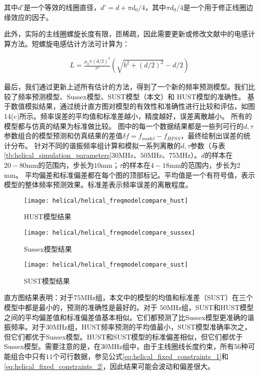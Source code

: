 其中$d'$是一个等效的线圈直径，$d'=d+\pi d_0/4$，其中$\pi d_0/4$是一个用于修正线圈边缘效应的因子。

此外，实际的主线圈螺旋长度有限，匝稀疏，因此需要更新或修改文献\cite[]{Siverns_Simkins_Weidt_Hensinger_2012}中的电感计算方法。短螺旋电感估计方法可计算为：

\begin{align}
    L=\frac{\mu_0 \pi (d/2)^2 }{\tau^2} (\sqrt{b^2+(d/2)^2}-d/2) \label{eq:helical_L_new}
\end{align}

最后，我们通过更新上述所有估计的方法，得到了一个新的频率预测模型。我们比较了频率预测模型、Sussex模型\cite[]{Siverns_Simkins_Weidt_Hensinger_2012}、SUST模型（本文）和 HUST模型\cite[]{Deng_Sun_Yuan_Xu_Zhang_Lu_Luo_2014}的准确性。
基于数值模拟结果，通过统计直方图对模型的有效性和准确性进行比较和评估，如图14(c)所示。频率误差的平均值和标准差越小，精度越好，误差离散越小。
所有的模型都与仿真的结果为标准做比较。
图中的每一个数据结果都是一些列可行的$d,\tau$参数组合的模型预测和仿真结果的差值$\delta f=f_{model}-f_{HFSS}$，最终绘制出误差的统计分布。
针对不同的谐振频率组计算和模拟一系列离散的$d,\tau$参数（与表\ref{tb:helical_simulation_parameters}$30$MHz、$50$MHz、$75$MHz）。$d$的样本在$20-80$mm的范围内，步长为$10$mm；$\tau$的样本在$4-18$mm的范围内，步长为$2$mm。
平均偏差和标准偏差都在每个图的顶部标记。平均值是一个有符号值，表示模型的整体频率预测效果。标准差表示频率误差的离散程度。
\begin{figure}
    \centering
    \caption[HUST模型结果]{HUST模型结果\label{helical_freqmodelcompare_hust}}
    \texttt{[image: helical/helical\_freqmodelcompare\_hust]}
\end{figure}

\begin{figure}
    \centering
    \caption[Sussex模型结果]{Sussex模型结果\label{helical_freqmodelcompare_sussex}}
    \texttt{[image: helical/helical\_freqmodelcompare\_sussex]}
\end{figure}

\begin{figure}
    \centering
    \caption[SUST模型结果]{SUST模型结果\label{helical_freqmodelcompare_sust}}
    \texttt{[image: helical/helical\_freqmodelcompare\_sust]}
\end{figure}

直方图结果表明：对于$75$MHz组，本文中的模型的均值和标准差（SUST）在三个模型中都是最小的，预测的准确性是最好的。对于 $50$MHz组，SUST和HUST模型之间的平均偏差值和标准偏差值基本相似。它们都预测了比Sussex模型更准确的谐振频率。对于$30$MHz组，HUST频率预测的平均值最小，SUST模型准确率次之，但它们都优于Sussex模型。HUST和SUST模型的标准偏差相似，但它们都优于Sussex模型。需要注意的是，在30MHz组中，由于主线圈线长度约束，所有$56$种可能组合中只有$11$个可行数据，参见公式\eqref{eq:helical_fixed_constraints_1}和\eqref{eq:helical_fixed_constraints_2}，因此结果可能会波动和偏差很大。

